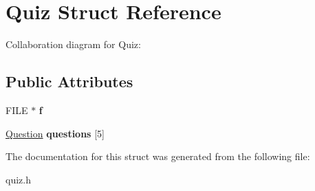 \hypertarget{structQuiz}{}\section{Quiz Struct Reference}
\label{structQuiz}


Collaboration diagram for Quiz\+:
\subsection*{Public Attributes}
\begin{DoxyCompactItemize}
\item 
\mbox{\label{structQuiz_a6814ab49dfb839fd4c22a94400875608}} 
F\+I\+LE $\ast$ {\bfseries f}
\item 
\mbox{\label{structQuiz_a3f0c3d3814be22e2dec49ccab712eaad}} 
\hyperlink{structQuestion}{Question} {\bfseries questions} \mbox{[}5\mbox{]}
\end{DoxyCompactItemize}


The documentation for this struct was generated from the following file\+:\begin{DoxyCompactItemize}
\item 
quiz.\+h\end{DoxyCompactItemize}
